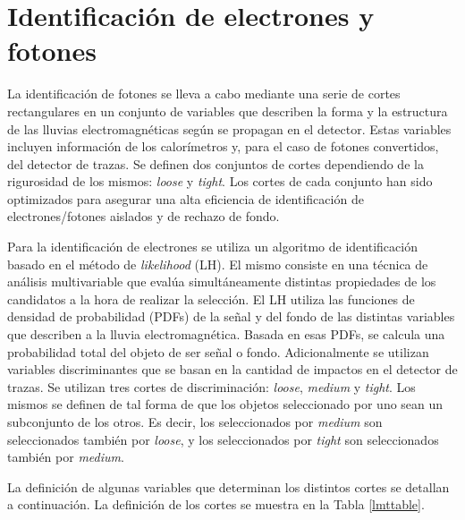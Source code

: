 \section{Identificación de electrones y fotones}

La identificación de fotones se lleva a cabo mediante una serie de cortes rectangulares en un conjunto de variables que describen la forma y la estructura de las lluvias electromagnéticas según se propagan en el detector. Estas variables incluyen información de los calorímetros y, para el caso de fotones convertidos, del detector de trazas. Se definen dos conjuntos de cortes dependiendo de la rigurosidad de los mismos: \textit{loose} y \textit{tight}. Los cortes de cada conjunto han sido optimizados para asegurar una alta eficiencia de identificación de electrones/fotones aislados y de rechazo de fondo. 

Para la identificación de electrones se utiliza un algoritmo de identificación basado en el método de \textit{likelihood} (LH). El mismo consiste en una técnica de análisis multivariable que evalúa simultáneamente distintas propiedades de los candidatos a la hora de realizar la selección. El LH utiliza las funciones de densidad de probabilidad (PDFs) de la señal y del fondo de las distintas variables que describen a la lluvia electromagnética. Basada en esas PDFs, se calcula una probabilidad total del objeto de ser señal o fondo. Adicionalmente se utilizan variables discriminantes que se basan en la cantidad de impactos en el detector de trazas. Se utilizan tres cortes de discriminación: \textit{loose}, \textit{medium} y \textit{tight}. Los mismos se definen de tal forma de que los objetos seleccionado por uno sean un subconjunto de los otros. Es decir, los seleccionados por \textit{medium} son seleccionados también por \textit{loose}, y los seleccionados por \textit{tight} son seleccionados también por \textit{medium}.


La definición de algunas variables que determinan los distintos cortes se detallan a continuación. La definición de los cortes se muestra en la Tabla \ref{lmttable}.


